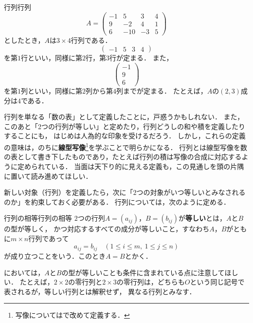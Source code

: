 \begin{example}{行列}{行列}
  \[
    A =
    \begin{pmatrix}
      -1 & 5 & 3 & 4 \\
      9 & -2 & 4 & 1 \\
      6 & -10 & -3 & 5
    \end{pmatrix}
  \]
  としたとき，$A$は$3 \times 4$行列である．
  \[
    \begin{pmatrix} -1 & 5 & 3 & 4 \end{pmatrix}
  \]
  を第$1$行といい，同様に第$2$行，第$3$行が定まる．
  また，
  \[
    \begin{pmatrix} -1 \\ 9 \\ 6 \end{pmatrix}
  \]
  を第$1$列といい，同様に第$2$列から第$4$列までが定まる．
  たとえば，$A$の$(2, 3)$成分は$4$である．
\end{example}

\begin{mycolumn}
  行列を単なる「数の表」として定義したことに，戸惑うかもしれない．
  また，このあと「2つの行列が等しい」と定めたり，行列どうしの和や積を定義したりすることにも，
  はじめは人為的な印象を受けるだろう．
  しかし，これらの定義の意味は，のちに\textbf{線型写像}\footnote{写像についてはで改めて定義する．}を学ぶことで明らかになる．
  行列とは線型写像を数の表として書き下したものであり，たとえば行列の積は写像の合成に対応するように定められている．
  当面は天下り的に見える定義も，この見通しを頭の片隅に置いて読み進めてほしい．
\end{mycolumn}

新しい対象（行列）を定義したら，次に「$2$つの対象がいつ等しいとみなされるのか」を約束しておく必要がある．
行列については，次のように定める．
 
\begin{definition}{行列の相等}{行列の相等}
  $2$つの行列$A = (a_{ij})$，$B = (b_{ij})$が\textbf{等しい}とは，$A$と$B$の型が等しく，
  かつ対応するすべての成分が等しいこと，すなわち$A$，$B$がともに$m \times n$行列であって
  \[
    a_{ij} = b_{ij} \quad (1 \le i \le m,~1 \le j \le n)
  \]
  が成り立つことをいう．このとき$A = B$とかく．
\end{definition}
 
においては，$A$と$B$の型が等しいことも条件に含まれている点に注意してほしい．
たとえば，$2 \times 2$の零行列と$2 \times 3$の零行列は，どちらも$O$という同じ記号で表されるが，等しい行列とは解釈せず，
異なる行列とみなす．

